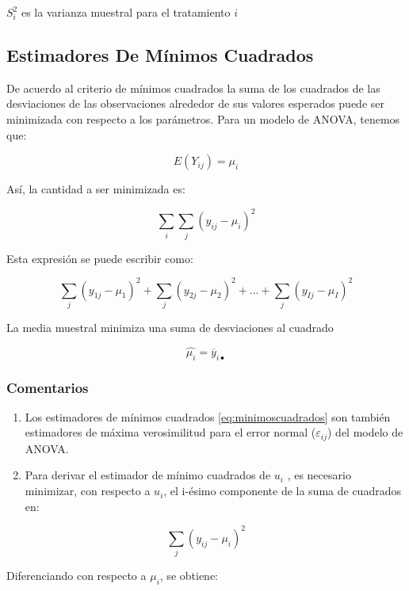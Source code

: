 \documentclass[]{book}
\theoremstyle{definition}
\theoremstyle{definition}
\theoremstyle{definition}
\theoremstyle{remark}
\begin{document}
\(S_{i}^{2}\) es la varianza muestral para el tratamiento \(i\)

\hypertarget{estimadores-de-minimos-cuadrados}{%
\subsection{Estimadores De Mínimos
Cuadrados}\label{estimadores-de-minimos-cuadrados}}

De acuerdo al criterio de mínimos cuadrados la suma de los cuadrados de
las desviaciones de las observaciones alrededor de sus valores esperados
puede ser minimizada con respecto a los parámetros. Para un modelo de
ANOVA, tenemos que:

\[
E\left( Y_{ij} \right) = \mu_{i}
\]

Así, la cantidad a ser minimizada es:

\[
\sum_{i}^{}{\sum_{j}^{}\left( y_{ij} - \mu_{i} \right)^{2}}
\]

Esta expresión se puede escribir como:

\[
\sum_{j}^{}\left( y_{1j} - \mu_{1} \right)^{2} + \sum_{j}^{}\left( y_{2j} - \mu_{2} \right)^{2} + \ldots + \sum_{j}^{}\left( y_{Ij} - \mu_{I} \right)^{2}
\]

La media muestral minimiza una suma de desviaciones al cuadrado

\begin{equation}
  \hat{\mu_{i}} = \overline{y}_{i\bullet}
  \label{eq:minimoscuadrados}
\end{equation}

\hypertarget{comentarios}{%
\subsubsection{Comentarios}\label{comentarios}}

\begin{enumerate}
\def\labelenumi{\arabic{enumi}.}
\item
  Los estimadores de mínimos cuadrados \eqref{eq:minimoscuadrados} son
  también estimadores de máxima verosimilitud para el error normal
  (\(\varepsilon_{ij}\)) del modelo de ANOVA.
\item
  Para derivar el estimador de mínimo cuadrados de \(u_{i}\) , es
  necesario minimizar, con respecto a \(u_{i}\), el i-ésimo componente
  de la suma de cuadrados en:
\end{enumerate}

\[
\sum_{j}^{}\left( y_{ij} - \mu_{i} \right)^{2}
\]

Diferenciando con respecto a \(\mu_{i}\), se obtiene:
\end{document}
